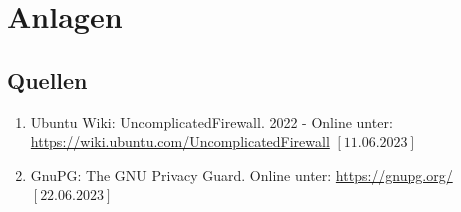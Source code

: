 \documentclass[a4paper, 12pt]{scrartcl}
\begin{document}
\newpage
\section{Anlagen}
\subsection{Quellen}\label{ch:src}
\begin{enumerate}
    \item Ubuntu Wiki: UncomplicatedFirewall. 2022 - Online unter: \newline\url{https://wiki.ubuntu.com/UncomplicatedFirewall} $\left[\text{11.06.2023}\right]$\label{src:ufw}
    \item GnuPG: The GNU Privacy Guard. Online unter: \newline\url{https://gnupg.org/} $\left[\text{22.06.2023}\right]$\label{src:gnupg}
\end{enumerate}
\begin{small}

\end{small}
\end{document}
